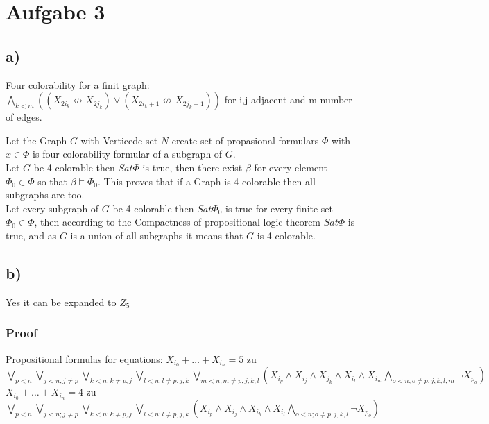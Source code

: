 \section*{Aufgabe 3}

\subsection*{a)}
Four colorability for a finit graph:\\
$\bigwedge_{k<m}((X_{2i_k} \not \leftrightarrow X_{2j_k}) \vee (X_{2i_k +1 } \not\leftrightarrow X_{2j_k +1}))$ for i,j adjacent and m number of edges.


Let the Graph $G$ with Verticede set $N$ create set of propasional formulars $\Phi$ with $x \in \Phi$ is four colorability formular of a subgraph of $G$.\\
Let $G$ be 4 colorable then $ Sat \Phi$ is true, then there exist $\beta$ for every element $\Phi_0 \in \Phi$ so that $\beta \vDash \Phi_0$. This proves that if a Graph is 4 colorable then all subgraphs are too.\\
Let every subgraph of $G$ be 4 colorable then $ Sat \Phi_0$ is true for every finite set  $\Phi_0 \in \Phi$, then according to the Compactness of propositional logic theorem $ Sat \Phi$ is true, and as $G$ is a union of all subgraphs it means that $G$ is 4 colorable.

\subsection*{b)}

Yes it can be expanded to $Z_5$

\subsubsection*{Proof} 
Propositional formulas for equations:
$X_{i_0} + \ldots + X_{i_n} = 5$ zu \\
$\bigvee_{p<n} \bigvee_{j<n;  j\neq p} \bigvee_{k<n;  k\neq p,j} \bigvee_{l<n;  l\neq p,j,k} \bigvee_{m<n;  m\neq p,j,k,l} (X_{i_p} \wedge X_{i_j} \wedge X_{j_k} \wedge X_{i_l} \wedge X_{i_m}   \bigwedge_{o<n;  o\neq p,j,k,l,m} \neg X_{p_o} )$\\

$X_{i_0} + \ldots + X_{i_n} = 4$ zu \\
$\bigvee_{p<n} \bigvee_{j<n;  j\neq p} \bigvee_{k<n;  k\neq p,j} \bigvee_{l<n;  l\neq p,j,k}  (X_{i_p} \wedge X_{i_j} \wedge X_{i_k} \wedge X_{i_l} \bigwedge_{o<n;  o\neq p,j,k,l} \neg X_{p_o} )$\\

